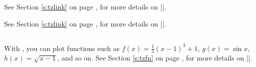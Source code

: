 See Section \ref{s:tzlink} on page \pageref{s:tzlink}, for more details on |\tzlink|.

See Section \ref{s:tzlink} on page \pageref{s:tzlinks}, for more details on |\tztos|.

\subsection{\protect\cmd{\tzfn}}
\label{ss:curves:tzfn}

With \icmd{\tzfn}, you can plot functions such as $f(x)=\frac13(x-1)^3+1$, $g(x)=\sin x$, $h(x)=\sqrt{x-1}$, and so on.
See Section \ref{s:tzfn} on page \pageref{s:tzfn}, for more details on |\tzfn|.







